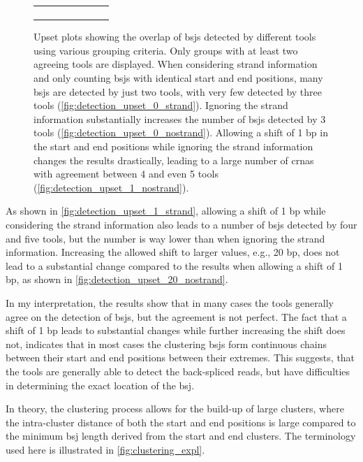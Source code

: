 \begin{figure}[ht]
\begin{tabular}{cc}
{\begin{subfigure}{\textwidth}
                       \end{subfigure}}\end{tabular} \caption{Upset plots
        showing the overlap of
        \gls{bsj}s detected by different tools using various grouping criteria.
        Only groups with at least two agreeing tools are displayed.
        When considering strand information and only counting \gls{bsj}s with identical
        start and end positions, many \gls{bsj}s are detected by just two tools, with
        very few detected by three tools (\cref{fig:detection_upset_0_strand}).
        Ignoring the strand information substantially increases the number of
        \gls{bsj}s detected by 3 tools (\cref{fig:detection_upset_0_nostrand}).
        Allowing a shift of 1 bp in the start and end positions while ignoring the
        strand information changes the results drastically, leading to a large number
        of \gls{crna}s with agreement between 4 and even 5 tools
        (\cref{fig:detection_upset_1_nostrand}).
    }
    \label{fig:detection_upset}
\end{figure}

As shown in \cref{fig:detection_upset_1_strand}, allowing a shift of 1 bp while
considering the strand information also leads to a number of \gls{bsj}s
detected by four and five tools, but the number is way lower than when ignoring
the strand information.
Increasing the allowed shift to larger values, e.g., 20 bp, does not lead to a
substantial change compared to the results when allowing a shift of 1 bp, as
shown in \cref{fig:detection_upset_20_nostrand}.

In my interpretation, the results show that in many cases the tools generally
agree on the detection of \gls{bsj}s, but the agreement is not perfect.
The fact that a shift of 1 bp leads to substantial changes while further
increasing the shift does not, indicates that in most cases the clustering
\gls{bsj}s form continuous chains between their start and end positions between
their extremes.
This suggests, that the tools are generally able to detect the back-spliced
reads, but have difficulties in determining the exact location of the
\gls{bsj}.

In theory, the clustering process allows for the build-up of large clusters,
where the intra-cluster distance of both the start and end positions is large
compared to the minimum \gls{bsj} length derived from the start and end
clusters.
The terminology used here is illustrated in \cref{fig:clustering_expl}.

